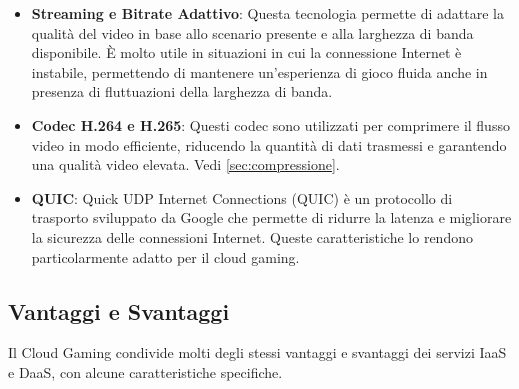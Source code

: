 \documentclass[12pt,a4paper,openright,twoside]{book}
\begin{document}
\begin{itemize}
    \item \textbf{Streaming e Bitrate Adattivo}: Questa tecnologia permette di adattare la qualità del video in base allo scenario presente e alla larghezza di banda disponibile. È molto utile in situazioni in cui la connessione Internet è instabile, permettendo di mantenere un'esperienza di gioco fluida anche in presenza di fluttuazioni della larghezza di banda.
    \item \textbf{Codec H.264 e H.265}: Questi codec sono utilizzati per comprimere il flusso video in modo efficiente, riducendo la quantità di dati trasmessi e garantendo una qualità video elevata. Vedi \ref{sec:compressione}.
    \item \textbf{QUIC}: Quick UDP Internet Connections (QUIC) è un protocollo di trasporto sviluppato da Google che permette di ridurre la latenza e migliorare la sicurezza delle connessioni Internet. Queste caratteristiche lo rendono particolarmente adatto per il cloud gaming.
\end{itemize}

\subsection{Vantaggi e Svantaggi}
Il Cloud Gaming condivide molti degli stessi vantaggi e svantaggi dei servizi IaaS e DaaS, con alcune caratteristiche specifiche.
\end{document}
